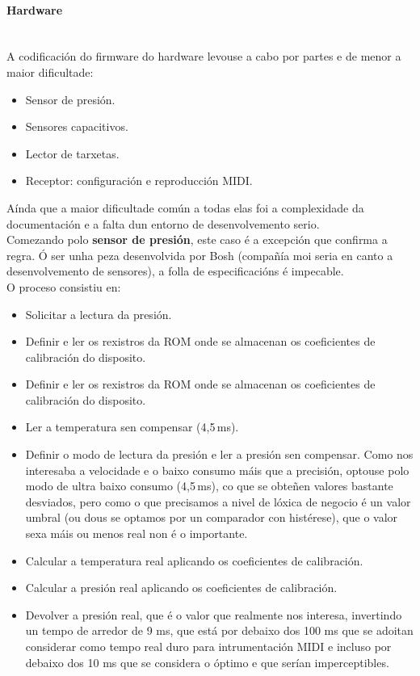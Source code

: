    \paragraph{Hardware}\mbox{}\\
   
   A codificación do firmware do hardware levouse a cabo por partes e de menor
   a maior dificultade:
   
   \begin{itemize}
    \item Sensor de presión.
    \item Sensores capacitivos.
    \item Lector de tarxetas.
    \item Receptor: configuración e reproducción MIDI.
   \end{itemize}
   
   Aínda que a maior dificultade común a todas elas foi a complexidade da
   documentación e a falta dun entorno de desenvolvemento serio. \\
   
   Comezando polo \textbf{sensor de presión}, este caso é a excepción que 
   confirma a regra. Ó ser unha peza desenvolvida por Bosh (compañía moi seria
   en canto a desenvolvemento de sensores), a folla de especificacións
   \cite{BMP085} é impecable. \\
   
    O proceso consistiu en:
    
    \begin{itemize}
    \item Solicitar a lectura da presión.
    \item Definir e ler os rexistros da ROM onde se almacenan os coeficientes de
        calibración do disposito.
    \item Definir e ler os rexistros da ROM onde se almacenan os coeficientes de
        calibración do disposito.
    \item Ler a temperatura sen compensar (4,5\,ms).
    \item Definir o modo de lectura da presión e ler a presión sen compensar.
        Como nos interesaba a velocidade e o baixo consumo máis que a precisión,
        optouse polo modo de ultra baixo consumo (4,5\,ms), co que se obteñen
        valores bastante desviados, pero como o que precisamos a nivel de lóxica
        de negocio é un valor umbral (ou dous se optamos por un comparador con
        histérese), que o valor sexa máis ou menos real non é o importante.
    \item Calcular a temperatura real aplicando os coeficientes de calibración.
    \item Calcular a presión real aplicando os coeficientes de calibración.
    \item Devolver a presión real, que é o valor que realmente nos interesa,
        invertindo un tempo de arredor de 9 ms, que está por debaixo dos 100 ms
        que se adoitan considerar como tempo real duro para intrumentación MIDI
        e incluso por debaixo dos 10 ms que se considera o óptimo e que serían
        imperceptibles.
   \end{itemize}
   
